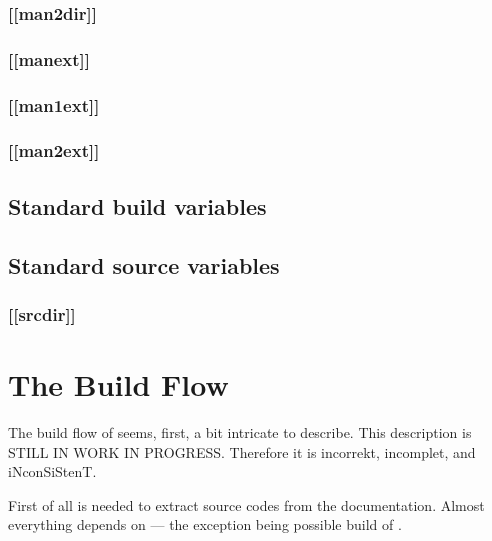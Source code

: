\documentclass{article}
\begin{document}
\subsubsection{[[man2dir]]}
\label{sec:general-structure:std-vars:man2dir}

\subsubsection{[[manext]]}
\label{sec:general-structure:std-vars:manext}

\subsubsection{[[man1ext]]}
\label{sec:general-structure:std-vars:man1ext}

\subsubsection{[[man2ext]]}
\label{sec:general-structure:std-vars:man2ext}

\subsection{Standard build variables}
\label{sec:general-structure:std-build}

\subsection{Standard source variables}
\label{sec:general-structure:std-source}

\subsubsection{[[srcdir]]}
\label{sec:general-structure:std-source:srcdir}



\section{The Build Flow}
\label{sec:build-flow}

The build flow of  seems, first, a bit intricate to describe.
This description is STILL IN WORK IN PROGRESS.  Therefore it is
incorrekt, incomplet, and iNconSiStenT.

First of all  is needed to extract source codes from the
documentation.  Almost everything depends on  --- the exception
being possible build of .
\end{document}
